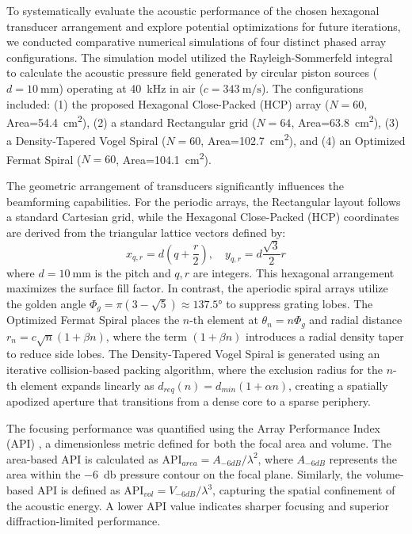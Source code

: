 \documentclass[pdflatex, sn-nature]{sn-jnl}
\theoremstyle{thmstyleone}%
\theoremstyle{thmstyletwo}%
\theoremstyle{thmstylethree}%
\begin{document}
To systematically evaluate the acoustic performance of the chosen hexagonal transducer arrangement and explore potential optimizations for future iterations, we conducted comparative numerical simulations of four distinct phased array configurations. The simulation model utilized the Rayleigh-Sommerfeld integral to calculate the acoustic pressure field generated by circular piston sources ($d=\qty{10}{\milli\meter}$) operating at \qty{40}{\kilo\hertz} in air ($c=\qty{343}{\meter\per\second}$). The configurations included: (1) the proposed Hexagonal Close-Packed (HCP) array ($N=60$, Area=\qty{54.4}{\centi\meter\squared}), (2) a standard Rectangular grid ($N=64$, Area=\qty{63.8}{\centi\meter\squared}), (3) a Density-Tapered Vogel Spiral ($N=60$, Area=\qty{102.7}{\centi\meter\squared}), and (4) an Optimized Fermat Spiral ($N=60$, Area=\qty{104.1}{\centi\meter\squared}).

The geometric arrangement of transducers significantly influences the beamforming capabilities. For the periodic arrays, the Rectangular layout follows a standard Cartesian grid, while the Hexagonal Close-Packed (HCP) coordinates are derived from the triangular lattice vectors defined by:
\begin{equation}
    x_{q,r} = d \left(q + \frac{r}{2}\right), \quad y_{q,r} = d \frac{\sqrt{3}}{2} r
\end{equation}
where $d=\qty{10}{\milli\meter}$ is the pitch and $q, r$ are integers. This hexagonal arrangement maximizes the surface fill factor. In contrast, the aperiodic spiral arrays utilize the golden angle $\Phi_g = \pi(3-\sqrt{5}) \approx \ang{137.5}$ to suppress grating lobes. The Optimized Fermat Spiral places the $n$-th element at $\theta_n = n \Phi_g$ and radial distance $r_n = c \sqrt{n} (1 + \beta n)$, where the term $(1 + \beta n)$ introduces a radial density taper to reduce side lobes. The Density-Tapered Vogel Spiral is generated using an iterative collision-based packing algorithm, where the exclusion radius for the $n$-th element expands linearly as $d_{req}(n) = d_{min}(1 + \alpha n)$, creating a spatially apodized aperture that transitions from a dense core to a sparse periphery.

The focusing performance was quantified using the Array Performance Index (API) \cite{priceFibonacciSpiralArranged2018, holmesPostprocessingFullMatrix2005}, a dimensionless metric defined for both the focal area and volume. The area-based API is calculated as $\text{API}_{area} = A_{-6dB} / \lambda^2$, where $A_{-6dB}$ represents the area within the \qty{-6}{\decibel} pressure contour on the focal plane. Similarly, the volume-based API is defined as $\text{API}_{vol} = V_{-6dB} / \lambda^3$, capturing the spatial confinement of the acoustic energy. A lower API value indicates sharper focusing and superior diffraction-limited performance.
\end{document}
